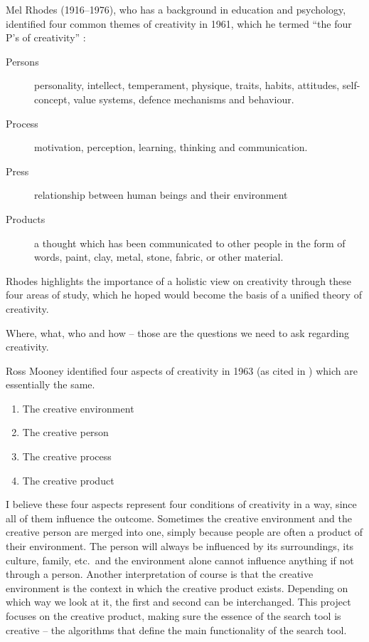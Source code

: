 Mel Rhodes (1916--1976), who has a background in education and psychology, identified four common themes of creativity in 1961, which he termed ``the four P’s of creativity'' \citep{Rhodes1961}:

\begin{description}
  \item [Persons] personality, intellect, temperament, physique, traits, habits, attitudes, self-concept, value systems, defence mechanisms and behaviour.
  \item [Process] motivation, perception, learning, thinking and communication.
  \item [Press] relationship between human beings and their environment
  \item [Products] a thought which has been communicated to other people in the form of words, paint, clay, metal, stone, fabric, or other material.
\end{description}

Rhodes highlights the importance of a holistic view on creativity through these four areas of study, which he hoped would become the basis of a unified theory of creativity.

\begin{draft}
  Where, what, who and how – those are the questions we need to ask regarding creativity.
\end{draft}

Ross Mooney identified four aspects of creativity in 1963 (as cited in \citep{Sternberg1999}) which are essentially the same.

\begin{enumerate}
  \item The creative environment
  \item The creative person
  \item The creative process
  \item The creative product
\end{enumerate}


\begin{draft}
  I believe these four aspects represent four conditions of creativity in a way, since all of them influence the outcome. Sometimes the creative environment and the creative person are merged into one, simply because people are often a product of their environment. The person will always be influenced by its surroundings, its culture, family, etc.\ and the environment alone cannot influence anything if not through a person. Another interpretation of course is that the creative environment is the context in which the creative product exists. Depending on which way we look at it, the first and second can be interchanged. This project focuses on the creative product, making sure the essence of the search tool is creative – the algorithms that define the main functionality of the search tool.
\end{draft}

